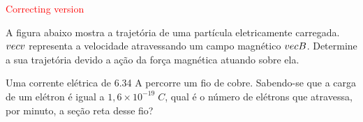 \documentclass[12pt, addpoints]{exam}
\begin{document}
        \begin{center}
\textcolor{red}{\emph\Large Correcting version}\end{center}
\begin{questions}
\begin{multicols*}{2}
\question[20] A ﬁgura abaixo mostra a trajetória de uma partícula eletricamente carregada. $\\vec{{v}}$ representa a velocidade atravessando um campo magnético $\\vec{{B}}$. Determine a sua trajetória devido a ação da força magnética atuando sobre ela.
        
        \begin{center}
            \begin{minipage}[c]{0.5\linewidth}
            \end{minipage}
        \end{center}

        

\begin{oneparchoices}
\end{oneparchoices}
\question[20] Uma corrente elétrica de    6.34 A percorre um ﬁo de cobre. Sabendo-se que a carga de um elétron é igual a $1,6\times 10^{-19}\;C$, qual é o número de elétrons que atravessa, por minuto, a seção reta desse ﬁo?


\end{multicols*}
\end{questions}
\end{document}
